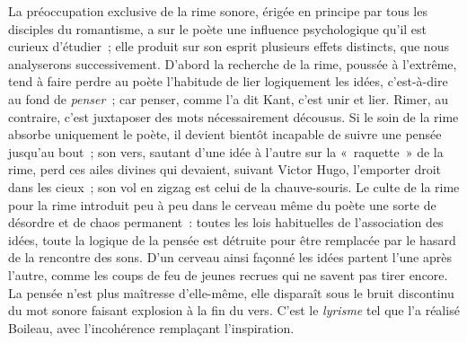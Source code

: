 \documentclass[french,twoside]{book} %
\begin{document}
 La préoccupation exclusive de la rime sonore, érigée en principe par tous les disciples du romantisme, a sur le poète une influence psychologique qu’il est curieux d’étudier ; elle produit sur son esprit plusieurs effets distincts,  que nous analyserons successivement. D’abord la recherche de la rime, poussée à l’extrême, tend à faire perdre au poète l’habitude de lier logiquement les idées, c’est-à-dire au fond de \emph{penser} ; car penser, comme l’a dit Kant, c’est unir et lier. Rimer, au contraire, c’est juxtaposer des mots nécessairement décousus. Si le soin de la rime absorbe uniquement le poète, il devient bientôt incapable de suivre une pensée jusqu’au bout ; son vers, sautant d’une idée à l’autre sur la « raquette » de la rime, perd ces ailes divines qui devaient, suivant Victor Hugo, l’emporter droit dans les cieux ; son vol en zigzag est celui de la chauve-souris. Le culte de la rime pour la rime introduit peu à peu dans le cerveau même du poète une sorte de désordre et de chaos permanent : toutes les lois habituelles de l’association des idées, toute la logique de la pensée est détruite pour être remplacée par le hasard de la rencontre des sons. D’un cerveau ainsi façonné les idées partent l’une après l’autre, comme les coups de feu de jeunes recrues qui ne savent pas tirer encore. La pensée n’est plus maîtresse d’elle-même, elle disparaît sous le bruit discontinu du mot sonore faisant explosion à la fin du vers. C’est le \emph{lyrisme} tel que l’a réalisé Boileau, avec l’incohérence remplaçant l’inspiration.\par
\end{document}
